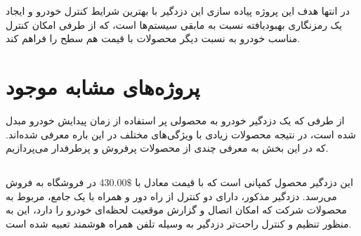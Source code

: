 \documentclass[a4paper,12pt]{report}
\begin{document}
		در انتها هدف این پروژه پیاده سازی این دزدگیر با بهترین شرایط کنترل خودرو و ایجاد یک رمزنگاری بهبودیافته نسبت به مابقی سیستم‌ها است، که از طرفی امکان کنترل مناسب خودرو به نسبت دیگر محصولات با قیمت هم سطح را فراهم کند.
	\section{
	پروژه‌های مشابه موجود
	}\label{sec3:chap1}
	از طرفی که یک دزدگیر خودرو به محصولی پر استفاده از زمان پیدایش خودرو مبدل شده است، در نتیجه محصولات زیادی با ويژگی‌های مختلف در این باره معرفی شده‌اند. که در این بخش به معرفی چندی از محصولات پرفروش و پرطرفدار می‌پردازیم.
	\subsection{
	}\label{subsec1:sec3:chap1}
	این دزدگیر محصول کمپانی
	است که با قیمت معادل با
	$430.00\$$
	در فروشگاه
		به فروش می‌رسد.
	دزدگیر مذکور، دارای دو کنترل از راه دور و همراه با یک
	جامع، مربوط به محصولات شرکت
		که امکان اتصال و گزارش موقعیت لحظه‌ای خودرو را دارد، این
	به منظور تنظیم و کنترل راحت‌تر دزدگیر به وسیله تلفن همراه هوشمند تعبیه شده است.
	\cite{viperCar35:online}
\end{document}
